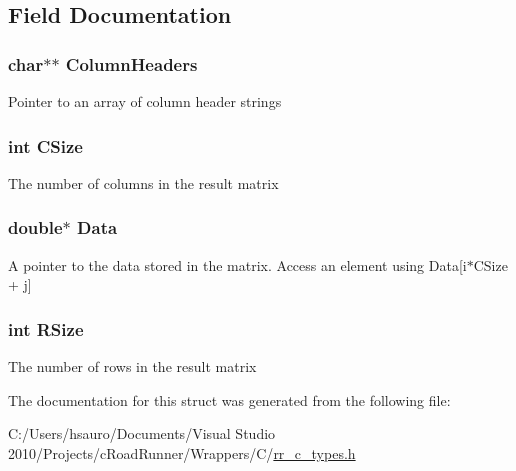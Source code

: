 \subsection{\-Field \-Documentation}
\hypertarget{struct_r_r_result_ab339159e5604808f92fe793f4f43da03}{
\subsubsection[{\-Column\-Headers}]{\setlength{\rightskip}{0pt plus 5cm}char$\ast$$\ast$ {\bf \-Column\-Headers}}}
\label{struct_r_r_result_ab339159e5604808f92fe793f4f43da03}
\-Pointer to an array of column header strings \hypertarget{struct_r_r_result_a17c9a5894aa9cb3789346dcaa9c370bb}{
\subsubsection[{\-C\-Size}]{\setlength{\rightskip}{0pt plus 5cm}int {\bf \-C\-Size}}}
\label{struct_r_r_result_a17c9a5894aa9cb3789346dcaa9c370bb}
\-The number of columns in the result matrix \hypertarget{struct_r_r_result_a7c5cbda3aa940f4b0d6e8a1679307dfc}{
\subsubsection[{\-Data}]{\setlength{\rightskip}{0pt plus 5cm}double$\ast$ {\bf \-Data}}}
\label{struct_r_r_result_a7c5cbda3aa940f4b0d6e8a1679307dfc}
\-A pointer to the data stored in the matrix. \-Access an element using \-Data\mbox{[}i$\ast$\-C\-Size + j\mbox{]} \hypertarget{struct_r_r_result_a4d8512c879223c0e0d1522dae38e7819}{
\subsubsection[{\-R\-Size}]{\setlength{\rightskip}{0pt plus 5cm}int {\bf \-R\-Size}}}
\label{struct_r_r_result_a4d8512c879223c0e0d1522dae38e7819}
\-The number of rows in the result matrix 

\-The documentation for this struct was generated from the following file\-:\begin{DoxyCompactItemize}
\item 
\-C\-:/\-Users/hsauro/\-Documents/\-Visual Studio 2010/\-Projects/c\-Road\-Runner/\-Wrappers/\-C/\hyperlink{rr__c__types_8h}{rr\-\_\-c\-\_\-types.\-h}\end{DoxyCompactItemize}
